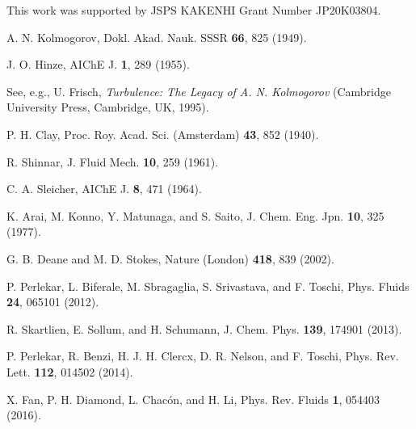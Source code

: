 \documentclass[pra,aps,superscriptaddress,twocolumn]{revtex4-2}
\begin{document}
This work was supported by JSPS KAKENHI Grant Number JP20K03804.



\begin{thebibliography}{99}

A. N. Kolmogorov,
Dokl. Akad. Nauk. SSSR \textbf{66}, 825 (1949).

J. O. Hinze,
AIChE J. \textbf{1}, 289 (1955).

See, e.g., U. Frisch, {\it Turbulence: The Legacy of A. N. Kolmogorov}
(Cambridge University Press, Cambridge, UK, 1995).

P. H. Clay,
Proc. Roy. Acad. Sci. (Amsterdam) \textbf{43}, 852 (1940).    

R. Shinnar,
J. Fluid Mech. \textbf{10}, 259 (1961).

C. A. Sleicher,
AIChE J. \textbf{8}, 471 (1964).

K. Arai, M. Konno, Y. Matunaga, and S. Saito,
J. Chem. Eng. Jpn. \textbf{10}, 325 (1977).

G. B. Deane and M. D. Stokes, 
Nature (London) \textbf{418}, 839 (2002).

P. Perlekar, L. Biferale, M. Sbragaglia, S. Srivastava, and F. Toschi,
Phys. Fluids \textbf{24}, 065101 (2012).

R. Skartlien, E. Sollum, and H. Schumann,
J. Chem. Phys. \textbf{139}, 174901 (2013).

P. Perlekar, R. Benzi, H. J. H. Clercx, D. R. Nelson, and F. Toschi,
Phys. Rev. Lett. \textbf{112}, 014502 (2014).

X. Fan, P. H. Diamond, L. Chac\'on, and H. Li,
Phys. Rev. Fluids \textbf{1}, 054403 (2016).
  

\end{thebibliography}
\end{document}
